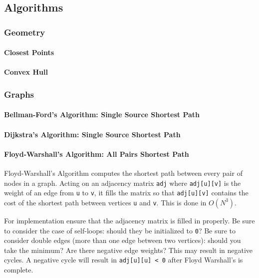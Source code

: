 \documentclass[letterpaper,11pt,twoside]{article}
\newcommand{\PartDivider}[1] {
    \clearpage
    \thispagestyle{empty}
    \vspace*{\stretch{2}}
    \begin{center}
        \part{#1}
    \end{center}
    \vspace*{\stretch{4}}
    \clearpage
}
\begin{document}
    \PartDivider{Algorithms}
        \section{Geometry}
            \subsection{Closest Points}
            \subsection{Convex Hull}

        \section{Graphs}
            \subsection{Bellman-Ford's Algorithm: Single Source Shortest Path}
            \subsection{Dijkstra's Algorithm: Single Source Shortest Path}
            \subsection{Floyd-Warshall's Algorithm: All Pairs Shortest Path}
                Floyd-Warshall's Algorithm computes the shortest path between every pair of nodes in a graph.
                Acting on an adjacency matrix \verb|adj| where \verb|adj[u][v]| is the weight of an edge from \verb|u| to \verb|v|, it fills the matrix so that \verb|adj[u][v]| contains the cost of the shortest path between vertices \verb|u| and \verb|v|.
                This is done in $O(N^{3})$.

                For implementation ensure that the adjacency matrix is filled in properly.
                Be sure to consider the case of self-loops: should they be initialized to \verb|0|?
                Be sure to consider double edges (more than one edge between two vertices): should you take the minimum?
                Are there negative edge weights?
                This may result in negative cycles.
                A negative cycle will result in \verb|adj[u][u] < 0| after Floyd Warshall's is complete.

                
                
\end{document}
